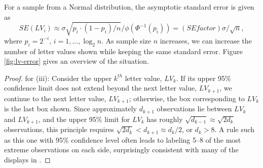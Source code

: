 \documentclass[12pt,oneside]{article}
\begin{document}
\begin{enumerate}
For a sample from a Normal distribution, the asymptotic standard error is given as 
\begin{equation}
SE(LV_i) \approx \sigma \sqrt{p_i \cdot (1 - p_i)/ n} / \phi(\Phi^{-1}(p_i)) 
 = (SEfactor) \sigma / \sqrt{n},
\label{SELV}
\end{equation}
where $p_i = 2^{-i}$, $i = 1, ..., \log_2n$.
As sample size $n$ increases, we can increase the number of letter values shown while keeping the same standard error. Figure \ref{fig:lv-error} gives an overview of  the situation.





\end{enumerate}





\begin{proof} for (iii):
Consider the upper $k^{th}$ letter value, $LV_k$. If its upper 95\% confidence limit does not extend beyond the next letter value, $LV_{k+1}$, we continue to the next letter value, $LV_{k+1}$; otherwise, the box corresponding to $LV_k$ is the last box shown. Since approximately $d_{k+1}$ observations lie between $LV_k$ and $LV_{k+1}$, and the upper 95\% limit for $LV_k$ has roughly $\sqrt{d_{k-1}} \approx \sqrt{2 d_k }$ observations, this principle requires $\sqrt{2 d_k} < d_{k+1} \approx d_k / 2$, or $d_k > 8$. A rule such as this one with 95\% confidence level often leads to labeling 5--8 of the most extreme observations on each side, surprisingly consistent with many of the displays in \citet{eda}.
\end{proof}
\end{document}
